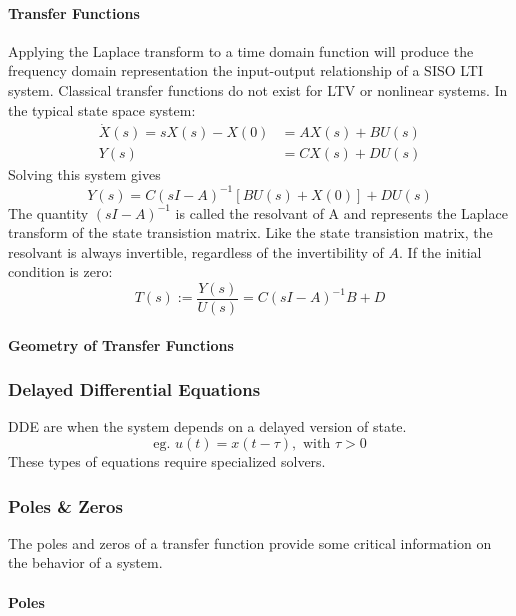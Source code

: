 \documentclass[../notes.tex]{subfiles}
\begin{document}
\paragraph{Transfer Functions} \label{sec:transfer_func}
Applying the Laplace transform to a time domain function will produce the frequency domain representation the input-output relationship of a SISO LTI system. Classical transfer functions do not exist for LTV or nonlinear systems. In the typical state space system:
\begin{align*}
    \dot{X}(s) = sX(s) - X(0) &= AX(s) + BU(s) \\
    Y(s) &= CX(s) + DU(s)
\end{align*}
Solving this system gives 
\begin{equation}
    Y(s) = C(sI-A)^{-1}[BU(s) + X(0)] + DU(s)
\end{equation}
The quantity $(sI-A)^{-1}$ is called the resolvant of A and represents the Laplace transform of the state transistion matrix. Like the state transistion matrix, the resolvant is always invertible, regardless of the invertibility of $A$. If the initial condition is zero:
\begin{equation}
    T(s) := \frac{Y(s)}{U(s)} = C(sI-A)^{-1}B+D
\end{equation}

\paragraph{Geometry of Transfer Functions}

\subsubsection{Delayed Differential Equations}
DDE are when the system depends on a delayed version of state.
\begin{equation}
    \text{eg. }u(t) = x(t-\tau), \text{ with } \tau > 0
\end{equation}
These types of equations require specialized solvers.

\subsubsection{Poles \& Zeros}
The poles and zeros of a transfer function provide some critical information on the behavior of a system.

\paragraph{Poles}
\end{document}
